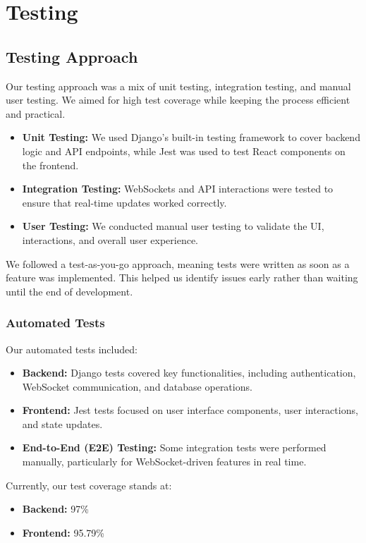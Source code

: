\chapter{Testing}
\label{chap:testing}

\section{Testing Approach}
Our testing approach was a mix of unit testing, integration testing, and manual user testing. We aimed for high test coverage while keeping the process efficient and practical.

\begin{itemize}
    \item \textbf{Unit Testing:} We used Django’s built-in testing framework to cover backend logic and API endpoints, while Jest was used to test React components on the frontend.
    \item \textbf{Integration Testing:} WebSockets and API interactions were tested to ensure that real-time updates worked correctly.
    \item \textbf{User Testing:} We conducted manual user testing to validate the UI, interactions, and overall user experience.
\end{itemize}

We followed a test-as-you-go approach, meaning tests were written as soon as a feature was implemented. This helped us identify issues early rather than waiting until the end of development.

\subsection{Automated Tests}
Our automated tests included:

\begin{itemize}
    \item \textbf{Backend:} Django tests covered key functionalities, including authentication, WebSocket communication, and database operations.
    \item \textbf{Frontend:} Jest tests focused on user interface components, user interactions, and state updates.
    \item \textbf{End-to-End (E2E) Testing:} Some integration tests were performed manually, particularly for WebSocket-driven features in real time.
\end{itemize}

Currently, our test coverage stands at:
\begin{itemize}
    \item \textbf{Backend:} 97\%
    \item \textbf{Frontend:} 95.79\%
\end{itemize}

